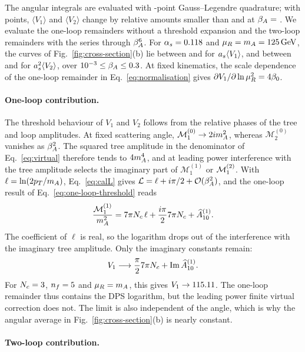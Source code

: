 The angular integrals are evaluated with \QuadNodes-point Gauss--Legendre quadrature; with \QuadNodesRef{} points, $\langle V_1\rangle$ and $\langle V_2\rangle$ change by relative amounts smaller than \QuadVoneDev{} and \QuadVtwoDev{} at $\beta_A=$ \QuadBetas.
We evaluate the one-loop remainders without a threshold expansion and the
two-loop remainders with the series through $\beta_A^6$. For
$\alpha_s=0.118$ and $\mu_R=m_A=125\,\mathrm{GeV}$, the curves of
Fig.~\ref{fig:cross-section}(b) lie between \VoneMin{} and \VoneMax{} for
$a_s\langle V_1\rangle$, and between \VtwoMin{} and \VtwoMax{} for
$a_s^2\langle V_2\rangle$, over $10^{-3}\leq\beta_A\leq0.3$.
At fixed kinematics, the scale dependence of the one-loop remainder in
Eq.~\eqref{eq:normalisation} gives $\partial V_1/\partial\ln\mu_R^2=4\beta_0$.

\paragraph{One-loop contribution.}

The threshold behaviour of $V_1$ and $V_2$ follows from the relative phases
of the tree and loop amplitudes. At fixed scattering angle,
$\mathcal M_1^{(0)}\to2im_A^2$, whereas $\mathcal M_2^{(0)}$ vanishes as
$\beta_A^2$. The squared tree amplitude in the denominator of
Eq.~\eqref{eq:virtual} therefore tends to $4m_A^4$, and at leading power
interference with the tree amplitude selects the imaginary part of
$\mathcal M_1^{(1)}$ or $\mathcal{M}^{(2)}_{1}$. With $\ell=\ln(2p_T/m_A)$,
Eq.~\eqref{eq:calL} gives $\mathcal L=\ell+i\pi/2+\mathcal{O}(\beta_A^2)$, and the
one-loop result of Eq.~\eqref{eq:one-loop-threshold} reads
\[
 \frac{\mathcal M_1^{(1)}}{m_A^2}
 =
 7\pi N_c\,\ell
 +\frac{i\pi}{2}7\pi N_c
 +\widehat A^{(1)}_{10}.
\]
The coefficient of $\ell$ is real, so the logarithm drops out of the
interference with the imaginary tree amplitude. Only the imaginary
constants remain:
\begin{equation}
 V_1\longrightarrow
 \frac{\pi}{2}7\pi N_c
 +\operatorname{Im}\widehat A^{(1)}_{10}.
 \label{eq:v1-threshold}
\end{equation}
For $N_c=3$, $n_f=5$ and $\mu_R=m_A$, this gives
$V_1\to115.11$. The one-loop remainder thus contains the DPS
logarithm, but the leading power finite virtual correction does not. The
limit is also independent of the angle, which is why the angular average in
Fig.~\ref{fig:cross-section}(b) is nearly constant.

\paragraph{Two-loop contribution.}

